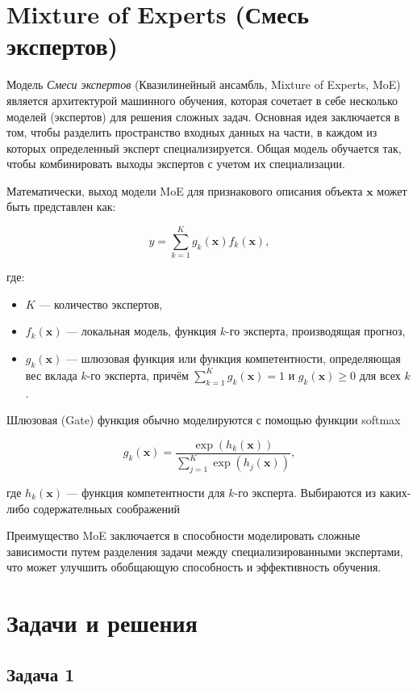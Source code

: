 \documentclass{article}
\begin{document}
\section*{Mixture of Experts (Смесь экспертов)}

Модель \textit{Смеси экспертов} (Квазилинейный ансамбль, Mixture of Experts, MoE) является архитектурой машинного обучения, которая сочетает в себе несколько моделей (экспертов) для решения сложных задач. Основная идея заключается в том, чтобы разделить пространство входных данных на части, в каждом из которых определенный эксперт специализируется. Общая модель обучается так, чтобы комбинировать выходы экспертов с учетом их специализации.

Математически, выход модели MoE для признакового описания объекта $\mathbf{x}$ может быть представлен как:

$$
y = \sum_{k=1}^{K} g_k(\mathbf{x}) f_k(\mathbf{x}),
$$

где:
\begin{itemize}
    \item $K$ — количество экспертов,
    \item $f_k(\mathbf{x})$ — локальная модель, функция $k$-го эксперта, производящая прогноз,
    \item $g_k(\mathbf{x})$ — шлюзовая функция или функция компетентности, определяющая вес вклада $k$-го эксперта, причём $\sum_{k=1}^{K} g_k(\mathbf{x}) = 1$ и $g_k(\mathbf{x}) \geq 0$ для всех $k$.
\end{itemize}

Шлюзовая (Gate) функция обычно моделируются с помощью функции softmax

$$
g_k(\mathbf{x}) = \frac{\exp(h_k(\mathbf{x}))}{\sum_{j=1}^{K} \exp(h_j(\mathbf{x}))},
$$

где $h_k(\mathbf{x})$ — функция компетентности для $k$-го эксперта. Выбираются из каких-либо содержателньых соображений

Преимущество MoE заключается в способности моделировать сложные зависимости путем разделения задачи между специализированными экспертами, что может улучшить обобщающую способность и эффективность обучения.

\section*{Задачи и решения}

\subsection*{Задача 1}
\end{document}
